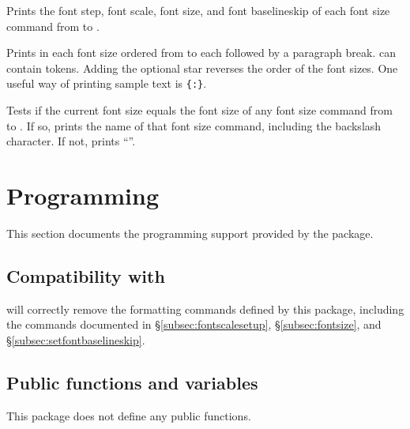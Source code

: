 \documentclass{beery}
\begin{document}
Prints the font step, font scale, font size, and font baselineskip of each font size command from  to .

\begin{mydisplaycode}
   \sarg{} 
\end{mydisplaycode}

Prints  in each font size ordered from  to  each followed by a paragraph break.
 can contain  tokens.
Adding the optional star reverses the order of the font sizes.
One useful way of printing sample text is \allowbreak\texttt{\{:\allowbreak\textvisiblespace\allowbreak{}\}}.

\begin{mydisplaycode}
\end{mydisplaycode}

Tests if the current font size equals the font size of any font size command from  to .
If so, prints the name of that font size command, including the backslash character.
If not, prints \enquote{\string\undefined}.


\section{Programming}
\label{sec:programming}

This section documents the  programming support provided by the  package.

\subsection
  {%
    Compatibility with
    \texorpdfstring
      {}
      {\textbackslash{}text\_purify:n}%
  }
\label{subsec:textpurify}

 will correctly remove the formatting commands defined by this package, including the commands documented in \S\ref{subsec:fontscalesetup}, \S\ref{subsec:fontsize}, and \S\ref{subsec:setfontbaselineskip}.

\subsection{Public functions and variables}
\label{subsec:publicexpl3}

This package does not define any public  functions.
\end{document}
